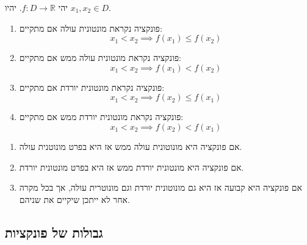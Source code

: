 \documentclass{tstextbook}
\begin{document}
\begin{definition}
יהי \(f:D\to\mathbb{R}\). יהיו \(x_{1},x_{2} \in D\).

  \begin{enumerate}
    \item פונקציה נקראת מונטונית עולה אם מתקיים: 
$$x_{1}< x_{2}\implies f(x_{1})\leq f(x_{2})$$


    \item פונקציה נקראת מונטונית עולה ממש אם מתקיים: 
$$x_{1}<x_{2}\implies f(x_{1})<f(x_{2})$$


    \item פונקציה נקראת מונטונית יורדת אם מתקיים: 
$$x_{1}<x_{2}\implies f(x_{2})\leq f(x_{1})$$


    \item פונקציה נקראת מונטונית יורדת ממש אם מתקיים: 
$$x_{1}<x_{2}\implies f(x_{2})<f(x_{1})$$


  \end{enumerate}
\end{definition}
\begin{corollary}
  \begin{enumerate}
    \item אם פונקציה היא מונוטונית עולה ממש אז היא בפרט מונוטנית עולה. 


    \item אם פונקציה היא מונטונית יורדת ממש אז היא בפרט מונטונית יורדת. 


    \item אם פונקציה היא קבועה אז היא גם מונוטונית יורדת וגם מונוטרית עולה, אך בכל מקרה אחר לא ייתכן שיקיים את שניהם. 


  \end{enumerate}
\end{corollary}
\subsection{גבולות של פונקציות}
\end{document}
